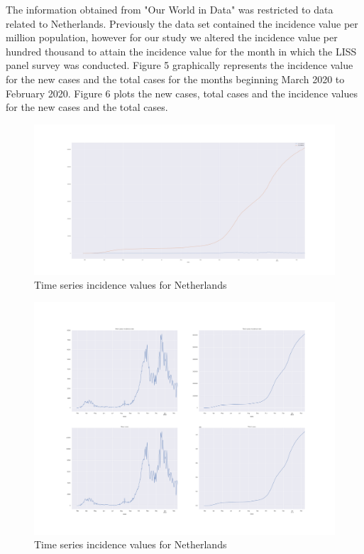 \documentclass[11pt, a4paper, leqno]{article}
\begin{document}
The information obtained from "Our World in Data" was restricted to data related to Netherlands. Previously the data set contained the incidence value per million population, however for our study we altered the incidence value per hundred thousand to attain the incidence value for the month in which the LISS panel survey was conducted. Figure 5 graphically represents the incidence value for the new cases and the total cases for the months beginning March 2020 to February 2020. Figure 6 plots the new cases, total cases and the incidence values for the new cases and the total cases. 


\begin{figure}[H]
    \caption{Time series incidence values for Netherlands}
    \includegraphics[width=\textwidth]{../../bld/figures/time_series}
\end{figure}

\begin{figure}[H]
    \caption{Time series incidence values for Netherlands}
    \includegraphics[width=\textwidth]{../../bld/figures/subplots}
\end{figure}
\end{document}

